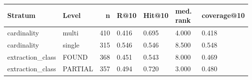 \begin{tabular}{llrllll}
\toprule
Stratum & Level & n & R@10 & Hit@10 & med. rank & coverage@10 \\
\midrule
cardinality & multi & 410 & 0.416 & 0.695 & 4.000 & 0.418 \\
cardinality & single & 315 & 0.546 & 0.546 & 8.500 & 0.548 \\
extraction_class & FOUND & 368 & 0.451 & 0.543 & 8.000 & 0.469 \\
extraction_class & PARTIAL & 357 & 0.494 & 0.720 & 3.000 & 0.480 \\
\bottomrule
\end{tabular}
